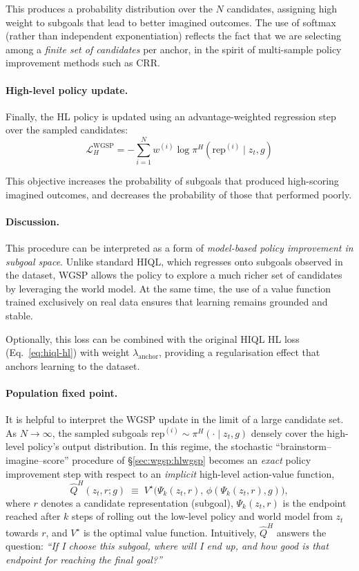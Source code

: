 This produces a probability distribution over the $N$ candidates,
assigning high weight to subgoals that lead to better imagined outcomes.
The use of softmax (rather than independent exponentiation) reflects the
fact that we are selecting among a \emph{finite set of candidates} per
anchor, in the spirit of multi-sample policy improvement methods such
as CRR.

\paragraph{High-level policy update.}
Finally, the HL policy is updated using an advantage-weighted regression
step over the sampled candidates:
\begin{equation}
\boxed{
\mathcal{L}_H^{\mathrm{WGSP}} =
- \sum_{i=1}^{N} w^{(i)} \log \pi^H(\text{rep}^{(i)} \mid z_t, g)
}
\label{eq:wgsp-hl-clean}
\end{equation}

This objective increases the probability of subgoals that produced
high-scoring imagined outcomes, and decreases the probability of those
that performed poorly.

\paragraph{Discussion.}
This procedure can be interpreted as a form of \emph{model-based policy
improvement in subgoal space}. Unlike standard HIQL, which regresses
onto subgoals observed in the dataset, WGSP allows the policy to explore
a much richer set of candidates by leveraging the world model. At the
same time, the use of a value function trained exclusively on real data
ensures that learning remains grounded and stable.

Optionally, this loss can be combined with the original HIQL HL loss
(Eq.~\ref{eq:hiql-hl}) with weight $\lambda_{\mathrm{anchor}}$,
providing a regularisation effect that anchors learning to the dataset.

\paragraph{Population fixed point.}
It is helpful to interpret the WGSP update in the limit of a large
candidate set. As $N \to \infty$, the sampled subgoals
$\text{rep}^{(i)} \sim \pi^H(\cdot \mid z_t, g)$ densely cover the
high-level policy’s output distribution. In this regime, the stochastic
``brainstorm--imagine--score'' procedure of
\S\ref{sec:wgsp:hlwgsp} becomes an \emph{exact} policy improvement step
with respect to an \emph{implicit} high-level action-value function,
\begin{equation*}
\hat Q^H(z_t, r; g)
\;\equiv\;
V^\star\!\big(\Psi_k(z_t, r),\,
\phi(\Psi_k(z_t, r), g)\big),
\end{equation*}
where $r$ denotes a candidate representation (subgoal),
$\Psi_k(z_t, r)$ is the endpoint reached after $k$ steps of rolling out
the low-level policy and world model from $z_t$ towards $r$, and
$V^\star$ is the optimal value function. Intuitively, $\hat Q^H$
answers the question: \emph{“If I choose this subgoal, where will I end
up, and how good is that endpoint for reaching the final goal?”}

